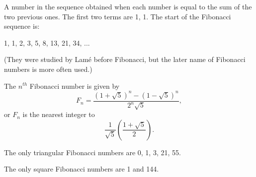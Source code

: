 A number in the sequence obtained when each number is equal to
the sum of the two previous ones. The first two
terms are 1, 1.  The start of the
Fibonacci sequence is:
\par
1, 1, 2, 3, 5, 8, 13, 21, 34, ...
\par
(They were studied by Lam\'e before Fibonacci, but the later name
of Fibonacci numbers is more often used.)
\par
The $n^{th}$  Fibonacci number is given by
\[ F_n = \frac{ (1 + \sqrt{5} ) ^n - ( 1 - \sqrt{5} ) ^n } { 2^n \sqrt{5} } , \]
or $F_{n}$  is the nearest integer to 
\[ \frac{1}{\sqrt{5}} \left ( \frac{1 + \sqrt{5} } {2} \right ) . \]
\par
The only triangular Fibonacci numbers are 0, 1, 3, 21, 55.
\par
The only square Fibonacci numbers are 1 and 144.
